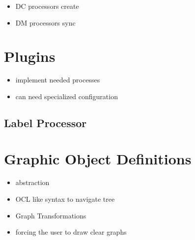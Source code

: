 \begin{itemize}
  \item DC processors create
  \item DM processors sync
\end{itemize}

\section{Plugins}
\begin{itemize}
  \item implement needed processes
  \item can need specialized configuration
\end{itemize}
\subsection{Label Processor}


\section{Graphic Object Definitions}







   


\begin{itemize}
  \item abstraction
  \item OCL like syntax to navigate tree
  \item Graph Transformations 
  \item forcing the user to draw clear graphs
\end{itemize}